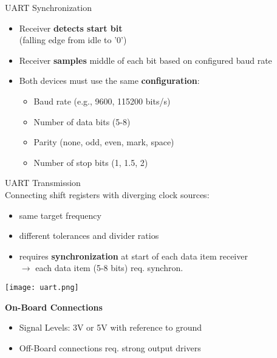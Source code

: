 \begin{concept}{UART Synchronization}
\begin{itemize}
    \item Receiver \textbf{detects start bit} \\ (falling edge from idle to '0')
    \item Receiver \textbf{samples} middle of each bit based on configured baud rate
    \item Both devices must use the same \textbf{configuration}:
    \begin{itemize}
        \item Baud rate (e.g., 9600, 115200 bits/s)
        \item Number of data bits (5-8)
        \item Parity (none, odd, even, mark, space)
        \item Number of stop bits (1, 1.5, 2)
    \end{itemize}
\end{itemize}
\end{concept}

\begin{concept}{UART Transmission}\\
    Connecting shift registers with diverging clock sources:
    \begin{itemize}
        \item same target frequency
        \item different tolerances and divider ratios
        \item requires \textbf{synchronization} at start of each data item receiver \\ $\rightarrow$ each data item (5-8 bits) req. synchron.
    \end{itemize}
    \texttt{[image: uart.png]}
    
    \textbf{On-Board Connections}
    \begin{itemize}
        \item Signal Levels: 3V or 5V with reference to ground
        \item Off-Board connections req. strong output drivers 
    \end{itemize}
\end{concept}

